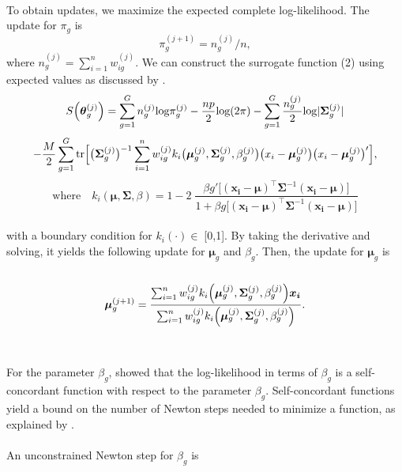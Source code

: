\documentclass[11pt]{article}
\begin{document}
\\
To obtain updates, we maximize the expected complete log-likelihood. The update for $\pi_g$ is 
\begin{equation}
\pi_g^{(j+1)}=n_g^{(j)}/n,    
\end{equation}
where $n_g^{(j)}=\sum_{i=1}^nw_{ig}^{(j)}$. We can construct the surrogate function (2) using expected values as discussed by \cite{browne2022revitalizing}. 
\\
\begin{equation}
S\Bigl(\boldsymbol{\theta}_g^{(j)}\Bigr) = \sum_{g=1}^{G}n_g^{(j)} \text{log}\pi_g^{(j)} - \frac{np}{2}\text{log}( 2 \pi ) - \sum_{g=1}^G\frac{n_g^{(j)}}{2} \text{log}|\boldsymbol{\Sigma}_g^{(j)}|\\
\end{equation}
$$-\frac{M}{2}\sum_{g=1}^G\text{tr}\Bigl[\bigl(\boldsymbol{\Sigma}_g^{(j)}\bigr)^{-1}\sum_{i=1}^{n}w_{ig}^{(j)}k_i\bigl(\boldsymbol{\mu}_g^{(j)},\boldsymbol{\Sigma}_g^{(j)},\beta_g^{(j)}\bigr)\bigl(x_i-\boldsymbol{\mu}_g^{(j)}\bigr)\bigl(x_i-\boldsymbol{\mu}_g^{(j)}\bigr)'\Bigr],$$
$$\text{where}\quad k_i(\boldsymbol{\mu,\Sigma},\beta) = 1-2\;\frac{\beta g'\bigl[(\boldsymbol{x_i-\mu})^{\top}\boldsymbol{\Sigma}^{-1}(\boldsymbol{x_i-\mu})\bigr]}{1+\beta g\bigl[(\boldsymbol{x_i-\mu})^{\top}\boldsymbol{\Sigma}^{-1}(\boldsymbol{x_i-\mu})\bigr]}$$
\\
with a boundary condition for $k_i(\cdot)\in\;$[0,1]. By taking the derivative and solving, it yields the following update for $\boldsymbol{\mu}_g$ and $\beta_g$. Then, the update for 
$\boldsymbol{\mu}_g$ is
\\ \\
\begin{equation}
\boldsymbol{\mu}_g^{(j+1)}=\frac{\sum_{i=1}^nw_{ig}^{(j)}k_i\Bigl(\boldsymbol{\mu}_g^{(j)},\boldsymbol{\Sigma}_g^{(j)},\beta_g^{(j)}\Bigr)\boldsymbol{x_i}}{\sum_{i=1}^nw_{ig}^{(j)}k_i\Bigl(\boldsymbol{\mu}_g^{(j)},\boldsymbol{\Sigma}_g^{(j)},\beta_g^{(j)}\Bigr)}.
\end{equation}
\\ \\
For the parameter $\beta_g$, \cite{browne2022revitalizing} showed that the log-likelihood in terms of $\beta_g$ is a self-concordant function with respect to the parameter $\beta_g$. Self-concordant functions yield a bound on the number of Newton steps needed to minimize a function, as explained by \cite{boyd2004convex}.\\
\\
An unconstrained Newton step for $\beta_g$ is
\end{document}
